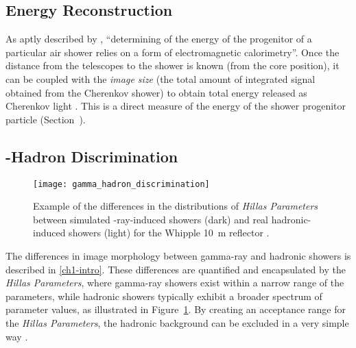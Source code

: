 \subsection{Energy Reconstruction}

As aptly described by \textcite[][p.~16]{Dickinson2010}, ``determining of the energy of the progenitor of a particular air shower relies on a form of electromagnetic calorimetry''. Once the distance from the telescopes to the shower is known (from the core position), it can be coupled with the \textit{image size} (the total amount of integrated signal obtained from the Cherenkov shower) to obtain total energy released as Cherenkov light \cite{Cogan2006,Bernlohr2013a}. This is a direct measure of the energy of the shower progenitor particle (Section~).

\subsection{\textgamma-Hadron Discrimination}

\begin{figure}
	\centering
    \texttt{[image: gamma\_hadron\_discrimination]} 
	\caption[Discriminating between images of gamma-ray and hadron induced showers.]{Example of the differences in the distributions of \textit{Hillas Parameters} between simulated \textgamma-ray-induced showers (dark) and real hadronic-induced showers (light) for the Whipple \SI{10}{m} reflector \cite{Fegan1999a}.}
	\label{fig:gamma_hadron_discrimination}
\end{figure}

The differences in image morphology between gamma-ray and hadronic showers is described in \ref{ch1-intro}. These differences are quantified and encapsulated by the \textit{Hillas Parameters}, where gamma-ray showers exist within a narrow range of the parameters, while hadronic showers typically exhibit a broader spectrum of parameter values, as illustrated in Figure~\ref{fig:gamma_hadron_discrimination}. By creating an acceptance range for the \textit{Hillas Parameters}, the hadronic background can be excluded in a very simple way \cite{Dickinson2010,Fegan1999a,Hillas1996a}.
